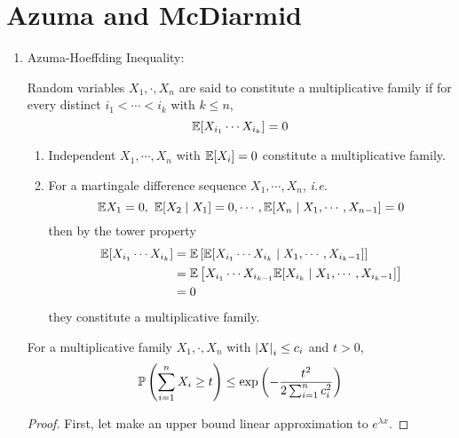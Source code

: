 \section{Azuma and McDiarmid}
\begin{enumerate}[label=\arabic{*}.]
	\item Azuma-Hoeffding Inequality: 
	\begin{defn}
	    Random variables $X_1,\cdot,X_n$ are said to constitute a multiplicative family if for every distinct $i_1<\cdots < i_k$ with $k \leq n$,
	    \begin{equation*}
	    	\mathbb{E}[X_{i_1}\cdots X_{i_k}] = 0
	    \end{equation*}
	\end{defn}
	\begin{exam}
	    \begin{enumerate}[label=(\arabic{*})]
	    	\item Independent $X_1,\cdots,X_n$ with $\mathbb{E}[X_i] = 0$ constitute a multiplicative family.
	    	\item For a martingale difference sequence $X_1,\cdots,X_n$, \emph{i.e.}
	    	\begin{equation*}
	    	    \mathbb{E} X_1 = 0,~\mathbb{E} [X_2 \mid X_1]=0,\cdots,\mathbb{E}[X_n \mid X_1,\cdots,X_{n-1}]=0
	    	\end{equation*}
	    	then by the tower property
	    	\begin{equation*}
	    		\begin{aligned}
	    			\mathbb{E}[X_{i_1}\cdots X_{i_k}] &= \mathbb{E}\left[\mathbb{E}[X_{i_1}\cdots X_{i_k} \mid  X_1,\cdots,X_{i_k-1}]\right] \\
	    			&= \mathbb{E}\left[X_{i_1}\cdots X_{i_{k-1}}\mathbb{E}[X_{i_k} \mid  X_1,\cdots,X_{i_k-1}]\right] \\
	    			&= 0
	    		\end{aligned}
	    	\end{equation*}
	    	they constitute a multiplicative family.
	    \end{enumerate}
	\end{exam}
	\begin{lem}
	    For a  multiplicative family $X_1,\cdot,X_n$ with $\left\lvert X\right\lvert_i \leq c_i$ and $t > 0$,
	    \begin{equation*}
	    	\mathbb{P}\left(\sum_{i=1}^n X_i \geq t\right) \leq \exp\left(-\frac{t^2}{2\sum_{i=1}^nc_i^2}\right)
	    \end{equation*}
	\end{lem}
	\begin{proof}
	    First, let make an upper bound linear approximation to $e^{\lambda x}$.

\end{proof}
\end{enumerate}
